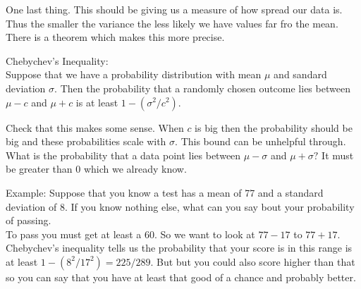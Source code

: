 \documentclass[14,fleqn]{article}
\begin{document}
One last thing. This should be giving us a measure of how spread our data is. Thus the smaller the variance the less likely we have values far fro the mean. There is a theorem which makes this more precise.

Chebychev's Inequality:\\
Suppose that we have a probability distribution with mean $\mu$ and sandard deviation $\sigma.$ Then the probability that a randomly chosen outcome lies between $\mu-c$ and $\mu+c$ is at least $1-(\sigma^2/c^2).$ 

Check that this makes some sense. When $c$ is big then the probability should be big and these probabilities scale with $\sigma.$ This bound can be unhelpful through. What is the probability that a data point lies between $\mu-\sigma$ and $\mu+\sigma?$ It must be greater than 0 which we already know.

Example: Suppose that you know a test has a mean of 77 and a standard deviation of 8. If you know nothing else, what can you say bout your probability of passing.\\

To pass you must get at least a 60. So we want to look at $77-17$ to $77+17.$ Chebychev's inequality tells us the probability that your score is in this range is at least $1-(8^2/17^2)=225/289.$ But but you could also score higher than that so you can say that you have at least that good of a chance and probably better.
\end{document}
